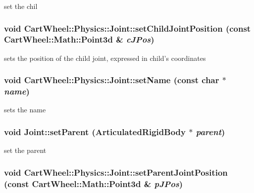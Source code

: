 set the chil \hypertarget{classCartWheel_1_1Physics_1_1Joint_a094d17f2e7d2f8ce267c873556828979}{
\subsubsection[{setChildJointPosition}]{\setlength{\rightskip}{0pt plus 5cm}void CartWheel::Physics::Joint::setChildJointPosition (const {\bf CartWheel::Math::Point3d} \& {\em cJPos})}}
\label{classCartWheel_1_1Physics_1_1Joint_a094d17f2e7d2f8ce267c873556828979}
sets the position of the child joint, expressed in child's coordinates \hypertarget{classCartWheel_1_1Physics_1_1Joint_a9548588237bafc0ee3ef24e03edfe1cd}{
\subsubsection[{setName}]{\setlength{\rightskip}{0pt plus 5cm}void CartWheel::Physics::Joint::setName (const char $\ast$ {\em name})}}
\label{classCartWheel_1_1Physics_1_1Joint_a9548588237bafc0ee3ef24e03edfe1cd}
sets the name \hypertarget{classCartWheel_1_1Physics_1_1Joint_a9aeff3d11d8b0938a916b380860f5f75}{
\subsubsection[{setParent}]{\setlength{\rightskip}{0pt plus 5cm}void Joint::setParent ({\bf ArticulatedRigidBody} $\ast$ {\em parent})}}
\label{classCartWheel_1_1Physics_1_1Joint_a9aeff3d11d8b0938a916b380860f5f75}
set the parent \hypertarget{classCartWheel_1_1Physics_1_1Joint_a3444214c6968a6823ba8de8f4a6082c0}{
\subsubsection[{setParentJointPosition}]{\setlength{\rightskip}{0pt plus 5cm}void CartWheel::Physics::Joint::setParentJointPosition (const {\bf CartWheel::Math::Point3d} \& {\em pJPos})}}
